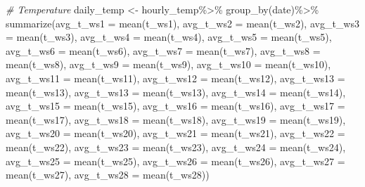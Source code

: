 \documentclass[
]{article}
\newenvironment{Shaded}{\begin{snugshade}}{\end{snugshade}}
\newcommand{\AttributeTok}[1]{\textcolor[rgb]{0.77,0.63,0.00}{#1}}
\newcommand{\CommentTok}[1]{\textcolor[rgb]{0.56,0.35,0.01}{\textit{#1}}}
\newcommand{\FunctionTok}[1]{\textcolor[rgb]{0.00,0.00,0.00}{#1}}
\newcommand{\NormalTok}[1]{#1}
\newcommand{\OtherTok}[1]{\textcolor[rgb]{0.56,0.35,0.01}{#1}}
\newcommand{\SpecialCharTok}[1]{\textcolor[rgb]{0.00,0.00,0.00}{#1}}
\begin{document}
\begin{Shaded}
\begin{Highlighting}[]
\CommentTok{\# Temperature}
\NormalTok{daily\_temp }\OtherTok{\textless{}{-}}\NormalTok{ hourly\_temp}\SpecialCharTok{\%\textgreater{}\%}
  \FunctionTok{group\_by}\NormalTok{(date)}\SpecialCharTok{\%\textgreater{}\%}
  \FunctionTok{summarize}\NormalTok{(}\AttributeTok{avg\_t\_ws1 =} \FunctionTok{mean}\NormalTok{(t\_ws1),}
            \AttributeTok{avg\_t\_ws2 =} \FunctionTok{mean}\NormalTok{(t\_ws2),}
            \AttributeTok{avg\_t\_ws3 =} \FunctionTok{mean}\NormalTok{(t\_ws3),}
            \AttributeTok{avg\_t\_ws4 =} \FunctionTok{mean}\NormalTok{(t\_ws4),}
            \AttributeTok{avg\_t\_ws5 =} \FunctionTok{mean}\NormalTok{(t\_ws5),}
            \AttributeTok{avg\_t\_ws6 =} \FunctionTok{mean}\NormalTok{(t\_ws6),}
            \AttributeTok{avg\_t\_ws7 =} \FunctionTok{mean}\NormalTok{(t\_ws7),}
            \AttributeTok{avg\_t\_ws8 =} \FunctionTok{mean}\NormalTok{(t\_ws8),}
            \AttributeTok{avg\_t\_ws9 =} \FunctionTok{mean}\NormalTok{(t\_ws9),}
            \AttributeTok{avg\_t\_ws10 =} \FunctionTok{mean}\NormalTok{(t\_ws10),}
            \AttributeTok{avg\_t\_ws11 =} \FunctionTok{mean}\NormalTok{(t\_ws11),}
            \AttributeTok{avg\_t\_ws12 =} \FunctionTok{mean}\NormalTok{(t\_ws12),}
            \AttributeTok{avg\_t\_ws13 =} \FunctionTok{mean}\NormalTok{(t\_ws13),}
            \AttributeTok{avg\_t\_ws13 =} \FunctionTok{mean}\NormalTok{(t\_ws13),}
            \AttributeTok{avg\_t\_ws14 =} \FunctionTok{mean}\NormalTok{(t\_ws14),}
            \AttributeTok{avg\_t\_ws15 =} \FunctionTok{mean}\NormalTok{(t\_ws15),}
            \AttributeTok{avg\_t\_ws16 =} \FunctionTok{mean}\NormalTok{(t\_ws16),}
            \AttributeTok{avg\_t\_ws17 =} \FunctionTok{mean}\NormalTok{(t\_ws17),}
            \AttributeTok{avg\_t\_ws18 =} \FunctionTok{mean}\NormalTok{(t\_ws18),}
            \AttributeTok{avg\_t\_ws19 =} \FunctionTok{mean}\NormalTok{(t\_ws19),}
            \AttributeTok{avg\_t\_ws20 =} \FunctionTok{mean}\NormalTok{(t\_ws20),}
            \AttributeTok{avg\_t\_ws21 =} \FunctionTok{mean}\NormalTok{(t\_ws21),}
            \AttributeTok{avg\_t\_ws22 =} \FunctionTok{mean}\NormalTok{(t\_ws22),}
            \AttributeTok{avg\_t\_ws23 =} \FunctionTok{mean}\NormalTok{(t\_ws23),}
            \AttributeTok{avg\_t\_ws24 =} \FunctionTok{mean}\NormalTok{(t\_ws24),}
            \AttributeTok{avg\_t\_ws25 =} \FunctionTok{mean}\NormalTok{(t\_ws25),}
            \AttributeTok{avg\_t\_ws26 =} \FunctionTok{mean}\NormalTok{(t\_ws26),}
            \AttributeTok{avg\_t\_ws27 =} \FunctionTok{mean}\NormalTok{(t\_ws27),}
            \AttributeTok{avg\_t\_ws28 =} \FunctionTok{mean}\NormalTok{(t\_ws28))}


\end{Highlighting}
\end{Shaded}
\end{document}
